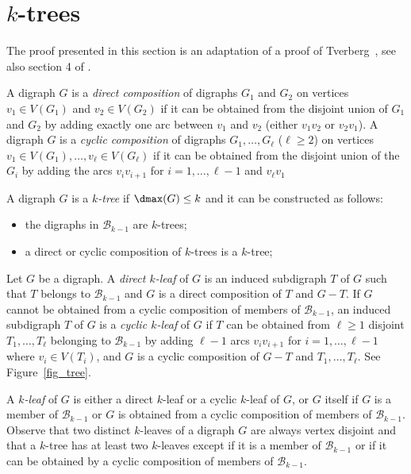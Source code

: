 
\section{$k$-trees}

The proof presented in this section is an adaptation of a proof of Tverberg~\cite{T83}, see also section 4 of \cite{CR14}. 

A digraph $G$ is a \emph{direct composition} of digraphs $G_{1}$ and $G_{2}$ on vertices $v_{1} \in V(G_{1})$ and $v_{2} \in V(G_{2})$ if it can be obtained from the disjoint union of $G_1$ and $G_2$ by adding exactly one arc between $v_1$ and $v_2$ (either $v_1v_2$ or $v_2v_1$). 
A digraph $G$ is a \emph{cyclic composition} of digraphs $G_{1}, \dots, G_{\ell}$ ($\ell \geq 2$) on vertices $v_{1} \in V(G_{1}), \dots, v_{\ell} \in V(G_{\ell})$ if it can be obtained from the disjoint union of the $G_{i}$ by adding  the arcs $v_iv_{i+1}$ for $i=1, \dots, \ell- 1$ and $v_{\ell}v_1$


A digraph $G$ is a \emph{$k$-tree} if $\dmax(G) \leq k$ and it can be constructed as follows:
\begin{itemize}
    \item the digraphs in $\mathcal B_{k-1}$ are $k$-trees;
    \item a  direct or cyclic composition of $k$-trees is a $k$-tree;
\end{itemize}



Let $G$ be a digraph. 
A \emph{direct $k$-leaf} of $G$ is an induced subdigraph $T$ of $G$ such that $T$ belongs to $\mathcal B_{k-1}$ and $G$ is a direct composition of $T$ and $G-T$. 
If $G$ cannot be obtained from a cyclic composition of members of $\mathcal B_{k-1}$, an induced subdigraph $T$ of $G$ is a  \emph{cyclic $k$-leaf} of $G$ if $T$ can be obtained from $\ell \geq 1$ disjoint  $T_1, \dots, T_{\ell}$ belonging to $\mathcal B_{k-1}$ by adding $\ell -1 $ arcs $v_iv_{i+1}$ for $i=1, \dots, \ell-1$ where $v_i \in V(T_i)$, and $G$ is a cyclic composition of $G - T$ and $T_1, \dots, T_{\ell}$. See Figure~\ref{fig_tree}. 

A \emph{$k$-leaf} of $G$ is either a direct $k$-leaf or a cyclic $k$-leaf of $G$, or $G$ itself if $G$ is a member of $\mathcal B_{k-1}$ or $G$ is obtained from a cyclic composition of members of $\mathcal B_{k-1}$.
Observe that two distinct $k$-leaves of a digraph $G$ are always vertex disjoint and that a $k$-tree has at least two $k$-leaves except if it is a member of $\mathcal B_{k-1}$ or if  it can be obtained by a cyclic composition of members of $\mathcal B_{k-1}$. 

